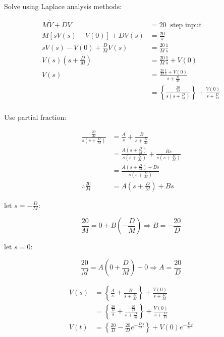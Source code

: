 \documentclass[
]{book}
\begin{document}
Solve using Laplace analysis methods:

\[
\begin{align}
M\dot{V} + DV &= 20 \;\;\text{step input} \\
M\left[ sV(s) - V(0) \right] + D V(s) &= \frac{20}{s} \\
sV(s) - V(0) + \frac{D}{M} V(s) &= \frac{20}{M} \frac{1}{s} \\
V(s) \left(s + \frac{D}{M} \right) &= \frac{20}{M} \frac{1}{s} + V(0) \\
V(s) &= \frac{ \frac{20}{M} \frac{1}{s} + V(0) }{s + \frac{D}{M} } \\
&= \left\{
          \frac{
                \frac{20}{M}
                }
                {s \left(
                          s + \frac{D}{M}
                        \right)
                } 
  \right\} + \frac{V(0)}{s + \frac{D}{M}} \\
\end{align}
\]

Use partial fraction:

\[
\begin{align}
\frac{ \frac{20}{M} }{s \left( s + \frac{D}{M} \right) } &= \frac{A}{s} + \frac{B}{s + \frac{D}{M}}\\
&= \frac{A \left( s + \frac{D}{M} \right)}{s \left( s + \frac{D}{M} \right) } + \frac{B s}{s \left( s + \frac{D}{M} \right) }\\
&= \frac{A \left( s + \frac{D}{M} \right) + B s}{s \left( s + \frac{D}{M} \right) }\\
\therefore \frac{20}{M} &= A \left( s + \frac{D}{M} \right) + B s
\end{align}  
\]

let \(s = -\frac{D}{M}\):

\[\frac{20}{M} = 0 + B \left(-\frac{D}{M}\right) \Rightarrow B = -\frac{20}{D} \]

let \(s = 0\):

\[\frac{20}{M} = A \left( 0 + \frac{D}{M} \right) + 0 \Rightarrow A = \frac{20}{D} \]

\[
\begin{align}
V(s) &= \left\{ \frac{A}{s} + \frac{B}{s + \frac{D}{M}} \right\} + \frac{V(0)}{s + \frac{D}{M}} \\
&= \left\{ \frac{\frac{20}{D}}{s} + \frac{-\frac{20}{D}}{s + \frac{D}{M}} \right\} + \frac{V(0)}{s + \frac{D}{M}} \\
V(t) &= \left\{ \frac{20}{D} -\frac{20}{D}e^{-\frac{D}{M}t} \right\} + V(0)e^{-\frac{D}{M}t} \\
\end{align}
\]
\end{document}

